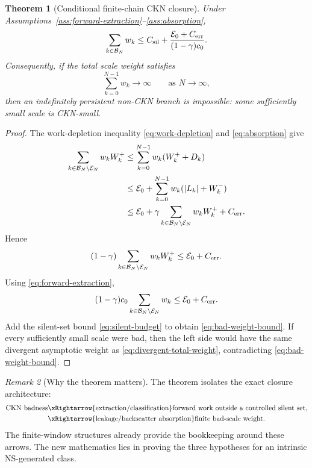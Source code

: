 \documentclass[11pt]{article}
\numberwithin{equation}{section}
\newtheorem{theorem}{Theorem}[section]
\theoremstyle{remark}
\newtheorem{remark}[theorem]{Remark}
\newcommand{\calB}{\mathcal B}
\newcommand{\calE}{\mathcal E}
\begin{document}
\begin{theorem}[Conditional finite-chain CKN closure]\label{thm:conditional-closure}
Under Assumptions~\ref{ass:forward-extraction}--\ref{ass:absorption},
\begin{equation}\label{eq:bad-weight-bound}
\sum_{k\in\calB_N}w_k
\le
C_{\rm sil}
+
\frac{\calE_0+C_{\rm err}}{(1-\gamma)c_0}.
\end{equation}
Consequently, if the total scale weight satisfies
\begin{equation}\label{eq:divergent-total-weight}
\sum_{k=0}^{N-1}w_k\longrightarrow\infty
\qquad\text{as }N\to\infty,
\end{equation}
then an indefinitely persistent non-CKN branch is impossible: some sufficiently small scale is CKN-small.
\end{theorem}

\begin{proof}
The work-depletion inequality \eqref{eq:work-depletion} and \eqref{eq:absorption} give
\begin{align*}
\sum_{k\in\calB_N\setminus\calE_N}w_kW_k^+
&\le
\sum_{k=0}^{N-1}w_k(W_k^++D_k)\\
&\le \calE_0+
\sum_{k=0}^{N-1}w_k(|L_k|+W_k^-)\\
&\le \calE_0+
\gamma\sum_{k\in\calB_N\setminus\calE_N}w_kW_k^+
+C_{\rm err}.
\end{align*}
Hence
\[
(1-\gamma)
\sum_{k\in\calB_N\setminus\calE_N}w_kW_k^+
\le \calE_0+C_{\rm err}.
\]
Using \eqref{eq:forward-extraction},
\[
(1-\gamma)c_0
\sum_{k\in\calB_N\setminus\calE_N}w_k
\le \calE_0+C_{\rm err}.
\]
Add the silent-set bound \eqref{eq:silent-budget} to obtain \eqref{eq:bad-weight-bound}. If every sufficiently small scale were bad, then the left side would have the same divergent asymptotic weight as \eqref{eq:divergent-total-weight}, contradicting \eqref{eq:bad-weight-bound}.
\end{proof}

\begin{remark}[Why the theorem matters]
The theorem isolates the exact closure architecture:
\begin{align*}
\text{CKN badness}
&\xRightarrow{\text{extraction/classification}}
\text{forward work outside a controlled silent set},\\
&\xRightarrow{\text{leakage/backscatter absorption}}
\text{finite bad-scale weight}.
\end{align*}
The finite-window structures already provide the bookkeeping around these arrows. The new mathematics lies in proving the three hypotheses for an intrinsic NS-generated class.
\end{remark}
\end{document}
